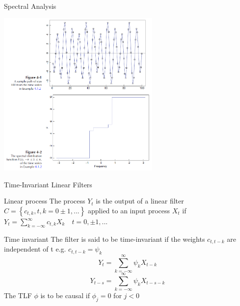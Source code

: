 \documentclass[11pt]{beamer}
\begin{document}

\begin{frame}{Spectral Analysis \cite{aastrom2021feedback}}
    \begin{center}
     \includegraphics[width=0.6\textwidth]{Pic/spectral_distribution.png}
    \end{center}
\end{frame}


\begin{frame}{Time-Invariant Linear Filters \cite{brockwell2002introduction}}
\begin{alertblock}{Linear process}
The process ${Y_{t}}$ is the output of a linear filter $C=\left\lbrace c_{t,k},t,k=0\pm1,...\right\rbrace$  applied to an input process ${X_{t}}$ if $Y_{t}=\sum^{\infty}_{k=-\infty}c_{t,k}X_{k}\quad t=0,\pm 1,...$
\end{alertblock}
\begin{alertblock}{Time invariant}
The filter is said to be time-invariant if the weights $c_{t,t-k}$ are independent of t e.g. $c_{t,t-k}=\psi_{k}$
\begin{equation*}
Y_{t}=\sum^{\infty}_{k=-\infty}\psi_{k}X_{t-k}
\end{equation*}
\begin{equation*}
Y_{t-s}=\sum^{\infty}_{k=-\infty}\psi_{k}X_{t-s-k}
\end{equation*}
The TLF $\phi$ is to be causal if $\phi_{j}=0$ for $j<0$
\end{alertblock}
\end{frame}
\end{document}
